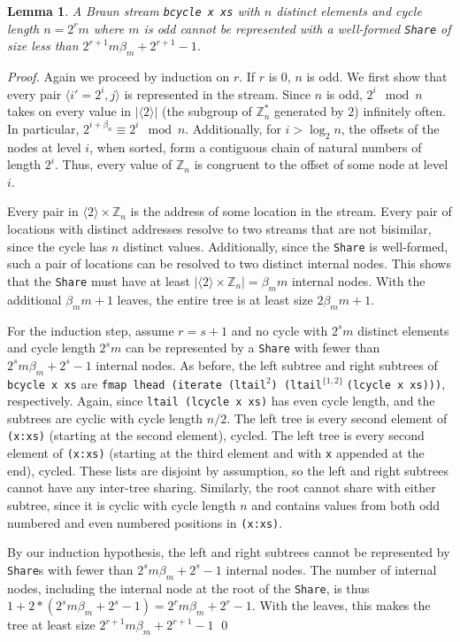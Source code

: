 \documentclass[envcountsect]{llncs}
\newcommand{\share}{{\tt Share} }
\newtheorem{lemma}[theorem]{Lemma}
\begin{document}
\begin{lemma}
A Braun stream {\tt bcycle x xs} with $n$ distinct elements and cycle length $n = 2^r m$ where $m$ is odd cannot be represented with a well-formed \share of size less than $2^{r+1} m \beta_m + 2^{r+1} - 1$.
\end{lemma}
\begin{proof}

Again we proceed by induction on $r$.
If $r$ is $0$, $n$ is odd.
We first show that every pair $\langle i'=2^i,j \rangle$ is represented in the stream.
Since $n$ is odd, $2^i \mod n$ takes on every value in $|\langle 2 \rangle|$ (the subgroup of $\mathbb{Z}_n^*$ generated by $2$) infinitely often.
In particular, $2^{i+\beta_n} \equiv 2^i \mod n$.
Additionally, for $i > \log_2 n$, the offsets of the nodes at level $i$, when sorted, form a contiguous chain of natural numbers of length $2^i$.
Thus, every value of $\mathbb{Z}_n$ is congruent to the offset of some node at level $i$.

Every pair in $\langle 2 \rangle \times \mathbb{Z}_n$ is the address of some location in the stream.
Every pair of locations with distinct addresses resolve to two streams that are not bisimilar, since the cycle has $n$ distinct values.
Additionally, since the \share is well-formed, such a pair of locations can be resolved to two distinct internal nodes.
This shows that the \share must have at least $|\langle 2 \rangle \times \mathbb{Z}_n| = \beta_m m$ internal nodes.
With the additional $\beta_m m + 1$ leaves, the entire tree is at least size $2 \beta_m m + 1$.

For the induction step, assume $r = s+1$ and no cycle with $2^s m$ distinct elements and cycle length $2^s m$ can be represented by a \share with fewer than $2^s m \beta_m + 2^s - 1$ internal nodes.
As before, the left subtree and right subtrees of {\tt bcycle x xs} are {\tt fmap lhead (iterate (ltail}$^2${\tt ) (ltail}$^{\{1,2\}}\ ${\tt (lcycle x xs)))}, respectively.
Again, since {\tt ltail (lcycle x xs)} has even cycle length, and the subtrees are cyclic with cycle length $n/2$.
The left tree is every second element of {\tt (x:xs)} (starting at the second element), cycled.
The left tree is every second element of {\tt (x:xs)} (starting at the third element and with {\tt x} appended at the end), cycled.
These lists are disjoint by assumption, so the left and right subtrees cannot have any inter-tree sharing.
Similarly, the root cannot share with either subtree, since it is cyclic with cycle length $n$ and contains values from both odd numbered and even numbered positions in {\tt (x:xs)}.

By our induction hypothesis, the left and right subtrees cannot be represented by {\tt Share}s with fewer than $2^s m \beta_m + 2^s - 1$ internal nodes.
The number of internal nodes, including the internal node at the root of the {\tt Share}, is thus $1+2*(2^s m \beta_m + 2^s - 1) = 2^r m \beta_m + 2^r - 1$.
With the leaves, this makes the tree at least size $2^{r+1} m \beta_m + 2^{r+1} - 1$
\qed
\end{proof}
\end{document}
